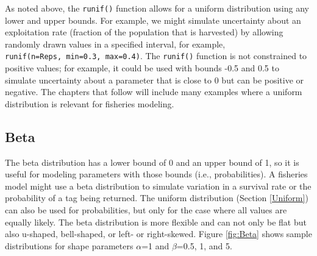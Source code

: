 \documentclass[
]{krantz}
\begin{document}
As noted above, the \texttt{runif()} function allows for a uniform distribution using any lower and upper bounds. For example, we might simulate uncertainty about an exploitation rate (fraction of the population that is harvested) by allowing randomly drawn values in a specified interval, for example, \texttt{runif(n=Reps,\ min=0.3,\ max=0.4)}. The \texttt{runif()} function is not constrained to positive values; for example, it could be used with bounds -0.5 and 0.5 to simulate uncertainty about a parameter that is close to 0 but can be positive or negative. The chapters that follow will include many examples where a uniform distribution is relevant for fisheries modeling.

\hypertarget{BetaDist}{%
\subsection{Beta}\label{BetaDist}}

The beta distribution has a lower bound of 0 and an upper bound of 1, so it is useful for modeling parameters with those bounds (i.e., probabilities). A fisheries model might use a beta distribution to simulate variation in a survival rate or the probability of a tag being returned. The uniform distribution (Section \ref{Uniform}) can also be used for probabilities, but only for the case where all values are equally likely. The beta distribution is more flexible and can not only be flat but also u-shaped, bell-shaped, or left- or right-skewed. Figure \ref{fig:Beta} shows sample distributions for shape parameters \(\alpha\)=1 and \(\beta\)=0.5, 1, and 5.
\end{document}

